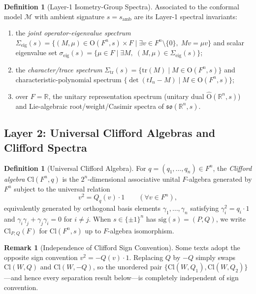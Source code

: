 \documentclass[11pt]{article}
\theoremstyle{definition}
\newtheorem{definition}[theorem]{Definition}
\newtheorem{remark}[theorem]{Remark}
\newcommand{\Cl}{\mathrm{Cl}}
\newcommand{\Orth}{\mathrm{O}}
\newcommand{\so}{\mathfrak{so}}
\newcommand{\sig}{\mathrm{sig}}
\newcommand{\tr}{\mathrm{tr}}
\begin{document}
\begin{definition}[Layer-1 Isometry-Group Spectra]\label{def:group-spectra}
Associated to the conformal model $\mathcal{M}$ with ambient signature $s = s_{\mathrm{amb}}$ are its Layer-1 spectral invariants:
\begin{enumerate}
  \item the \emph{joint operator-eigenvalue spectrum} $\Sigma_{\mathrm{eig}}(s) = \{(M, \mu) \in \Orth(F^n, s) \times F \mid \exists v \in F^n \setminus \{0\},\; Mv = \mu v\}$ and scalar eigenvalue set $\sigma_{\mathrm{eig}}(s) = \{\mu \in F \mid \exists M,\; (M, \mu) \in \Sigma_{\mathrm{eig}}(s)\}$;
  \item the \emph{character/trace spectrum} $\Sigma_{\tr}(s) = \{\tr(M) \mid M \in \Orth(F^n, s)\}$ and characteristic-polynomial spectrum $\{\det(tI_n - M) \mid M \in \Orth(F^n, s)\}$;
  \item over $F = \mathbb{R}$, the unitary representation spectrum (unitary dual $\widehat{\Orth}(\mathbb{R}^n, s)$) and Lie-algebraic root/weight/Casimir spectra of $\so(\mathbb{R}^n, s)$.
\end{enumerate}
\end{definition}

\subsection{Layer 2: Universal Clifford Algebras and Clifford Spectra}

\begin{definition}[Universal Clifford Algebra]\label{def:clifford}
For $q = (q_1, \dots, q_n) \in F^n$, the \emph{Clifford algebra} $\Cl(F^n, q)$ is the $2^n$-dimensional associative unital $F$-algebra generated by $F^n$ subject to the universal relation
\begin{equation}\label{eq:clifford-rel}
  v^2 = Q_q(v)\cdot 1 \qquad (\forall v \in F^n),
\end{equation}
equivalently generated by orthogonal basis elements $\gamma_1, \dots, \gamma_n$ satisfying $\gamma_i^2 = q_i \cdot 1$ and $\gamma_i \gamma_j + \gamma_j \gamma_i = 0$ for $i \neq j$. When $s \in \{\pm 1\}^n$ has $\sig(s) = (P, Q)$, we write $\Cl_{P,Q}(F)$ for $\Cl(F^n, s)$ up to $F$-algebra isomorphism.
\end{definition}

\begin{remark}[Independence of Clifford Sign Convention]
Some texts adopt the opposite sign convention $v^2 = -Q(v)\cdot 1$. Replacing $Q$ by $-Q$ simply swaps $\Cl(W, Q)$ and $\Cl(W, -Q)$, so the unordered pair $\{\Cl(W, Q_1), \Cl(W, Q_2)\}$---and hence every separation result below---is completely independent of sign convention.
\end{remark}
\end{document}
